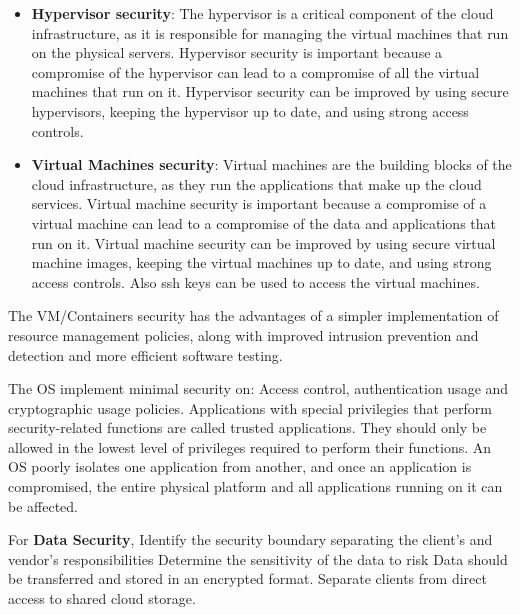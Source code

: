 \begin{itemize}
    \item \textbf{Hypervisor security}: The hypervisor is a critical component of the cloud infrastructure, as it is responsible for managing the virtual machines that run on the physical servers. Hypervisor security is important because a compromise of the hypervisor can lead to a compromise of all the virtual machines that run on it. Hypervisor security can be improved by using secure hypervisors, keeping the hypervisor up to date, and using strong access controls.
    \item \textbf{Virtual Machines security}: Virtual machines are the building blocks of the cloud infrastructure, as they run the applications that make up the cloud services. Virtual machine security is important because a compromise of a virtual machine can lead to a compromise of the data and applications that run on it. Virtual machine security can be improved by using secure virtual machine images, keeping the virtual machines up to date, and using strong access controls. Also ssh keys can be used to access the virtual machines.
\end{itemize}

The VM/Containers security has the advantages of a simpler implementation of resource management policies, along with improved intrusion prevention and detection and more efficient software testing. 

The OS implement minimal security on: Access control, authentication usage and cryptographic usage policies. Applications with special privilegies that perform security-related functions are called trusted applications. They should only be allowed in the lowest level of privileges required to perform their functions. An OS poorly isolates one application from another, and once an application is
compromised, the entire physical platform and all applications running on it can be
affected.

For \textbf{Data Security}, Identify the security boundary separating the client’s and vendor’s responsibilities
Determine the sensitivity of the data to risk
Data should be transferred and stored in an encrypted format.
Separate clients from direct access to shared cloud storage.

